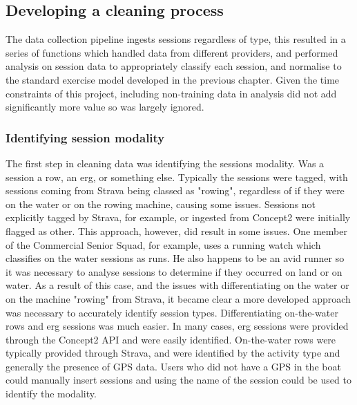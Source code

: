 \subsection{Developing a cleaning process}
The data collection pipeline ingests sessions regardless of type, this resulted in a series of functions which handled data from different providers, and performed analysis on session data to appropriately classify each session, and normalise to the standard exercise model developed in the previous chapter. Given the time constraints of this project, including non-training data in analysis did not add significantly more value so was largely ignored. 

\subsubsection{Identifying session modality}
The first step in cleaning data was identifying the sessions modality. Was a session a row, an erg, or something else. Typically the sessions were tagged, with sessions coming from Strava being classed as "rowing", regardless of if they were on the water or on the rowing machine, causing some issues. Sessions not explicitly tagged by Strava, for example, or ingested from Concept2 were initially flagged as other. This approach, however, did result in some issues. One member of the Commercial Senior Squad, for example, uses a running watch which classifies on the water sessions as runs. He also happens to be an avid runner so it was necessary to analyse sessions to determine if they occurred on land or on water. As a result of this case, and the issues with differentiating on the water or on the machine "rowing" from Strava, it became clear a more developed approach was necessary to accurately identify session types. Differentiating on-the-water rows and erg sessions was much easier. In many cases, erg sessions were provided through the Concept2 API and were easily identified. On-the-water rows were typically provided through Strava, and were identified by the activity type and generally the presence of GPS data. Users who did not have a GPS in the boat could manually insert sessions and using the name of the session could be used to identify the modality.


